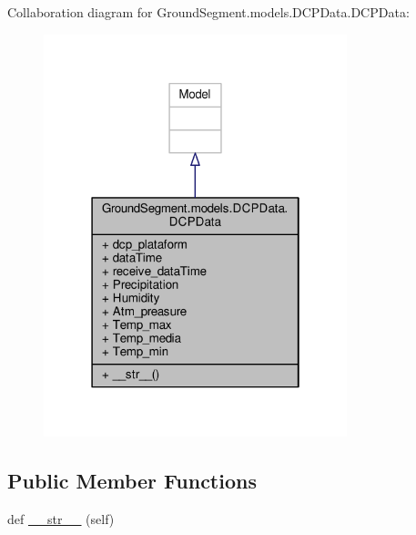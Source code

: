 Collaboration diagram for Ground\+Segment.\+models.\+D\+C\+P\+Data.\+D\+C\+P\+Data\+:\nopagebreak
\begin{figure}[H]
\begin{center}
\leavevmode
\includegraphics[width=250pt]{class_ground_segment_1_1models_1_1_d_c_p_data_1_1_d_c_p_data__coll__graph}
\end{center}
\end{figure}
\subsection*{Public Member Functions}
\begin{DoxyCompactItemize}
\item 
def \hyperlink{class_ground_segment_1_1models_1_1_d_c_p_data_1_1_d_c_p_data_a759facd035127c2b7c8c0921fc05a973}{\+\_\+\+\_\+str\+\_\+\+\_\+} (self)
\end{DoxyCompactItemize}
